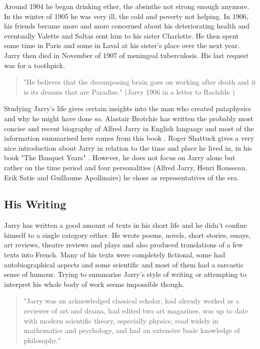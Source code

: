 Around 1904 he began drinking ether, the absinthe not strong enough anymore. In the winter of 1905 he was very ill, the cold and poverty not helping. In 1906, his friends became more and more concerned about his deteriorating health and eventually Valette and Saltas sent him to his sister Charlotte. He then spent some time in Paris and some in Laval at his sister's place over the next year. Jarry then died in November of 1907 of meningeal tuberculosis. His last request was for a toothpick.

\begin{quote}
  "He believes that the decomposing brain goes on working after death and it is its dreams that are Paradise." (Jarry 1906 in a letter to Rachilde \citep{Brotchie2007})
\end{quote}

Studying Jarry's life gives certain insights into the man who created pataphysics and why he might have done so. Alastair Brotchie has written the probably most concise and recent biography of Alfred Jarry in English language and most of the information summarised here comes from this book \citep{Brotchie2011}. Roger Shattuck gives a very nice introduction about Jarry in relation to the time and place he lived in, in his book "The Banquet Years" \citep{Shattuck1959}. However, he does not focus on Jarry alone but rather on the time period and four personalities (Alfred Jarry, Henri Rousseau, Erik Satie and Guillaume Apollinaire) he chose as representatives of the era.


\subsection{His Writing}

Jarry has written a good amount of texts in his short life and he didn't confine himself to a single category either. He wrote poems, novels, short stories, essays, art reviews, theatre reviews and plays and also produced translations of a few texts into French. Many of his texts were completely fictional, some had autobiographical aspects and some scientific and most of them had a sarcastic sense of humour. Trying to summarise Jarry's style of writing or attempting to interpret his whole body of work seems impossible though.

\begin{quote}
  "Jarry was an acknowledged classical scholar, had already worked as a reviewer of art and drama, had edited two art magazines, was up to date with modern scientific theory, especially physics, read widely in mathematics and psychology, and had an extensive basic knowledge of philosophy." \citep{Brotchie2011}
\end{quote}

